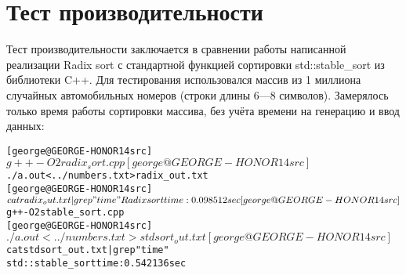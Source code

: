 \section{Тест производительности}
Тест производительности заключается в сравнении работы написанной реализации Radix sort с стандартной функцией сортировки std::stable_sort из библиотеки C++. Для тестирования использовался массив из 1 миллиона случайных автомобильных номеров (строки длины 6—8 символов). Замерялось только время работы сортировки массива, без учёта времени на генерацию и ввод данных:

\begin{alltt}
[george@GEORGE-HONOR14 src]$ g++ -O2 radix_sort.cpp
[george@GEORGE-HONOR14 src]$ ./a.out < ../numbers.txt > radix_out.txt
[george@GEORGE-HONOR14 src]$ cat radix_out.txt | grep "time"
Radix sort time: 0.098512 sec
[george@GEORGE-HONOR14 src]$ g++ -O2 stable_sort.cpp
[george@GEORGE-HONOR14 src]$ ./a.out < ../numbers.txt > stdsort_out.txt
[george@GEORGE-HONOR14 src]$ cat stdsort_out.txt | grep "time"
std::stable_sort time: 0.542136 sec
\end{alltt}

\pagebreak

